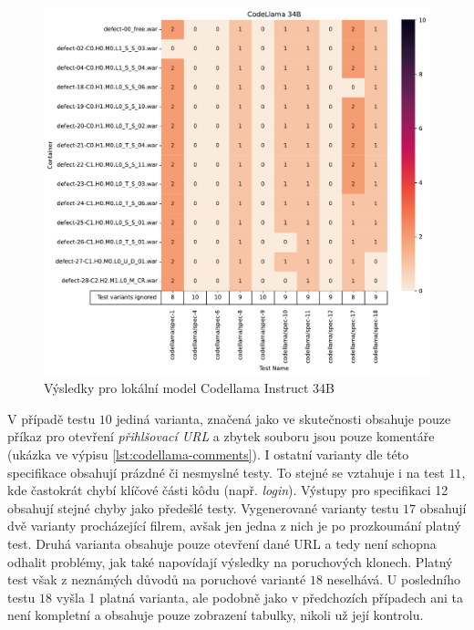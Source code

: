 \documentclass[czech, ma, kiv, he, iso690numb, pdf, viewonly]{fasthesis}
\begin{document}
            \begin{figure}
                \includegraphics[width=\textwidth]{pic/codellama-34b-results.pdf}
                \caption{Výsledky pro lokální model Codellama Instruct 34B}
                \label{fig:res:codellama}
            \end{figure}

            V případě testu \(10\) jediná varianta, značená jako  ve skutečnosti obsahuje pouze příkaz pro otevření \textit{přihlšovací URL} a zbytek souboru jsou pouze komentáře (ukázka ve výpisu \ref{lst:codellama-comments}). I ostatní varianty dle této specifikace obsahují prázdné či nesmyslné testy. To stejné se vztahuje i na test \(11\), kde častokrát chybí klíčové části kôdu (např. \textit{login}). Výstupy pro specifikaci 12 obsahují stejné chyby jako předešlé testy. Vygenerované varianty testu \(17\) obsahují dvě varianty procházející filrem, avšak jen jedna z nich je po prozkoumání platný test. Druhá varianta obsahuje pouze otevření dané URL a tedy není schopna odhalit problémy, jak také napovídají výsledky na poruchových klonech. Platný test však z neznámých důvodů na poruchové varianté \(18\) neselhává. U posledního testu \(18\) vyšla 1 platná varianta, ale podobně jako v předchozích případech ani ta není kompletní a obsahuje pouze zobrazení tabulky, nikoli už její kontrolu.
\end{document}
